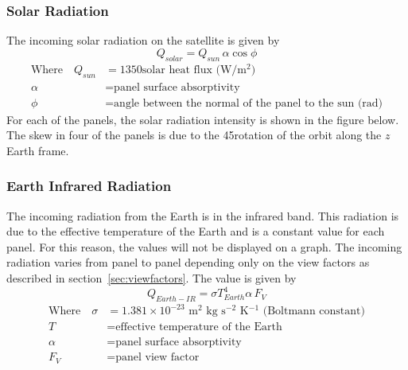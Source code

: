 \subsubsection{Solar Radiation}
The incoming solar radiation on the satellite is given by
\begin{equation}
    Q_{solar} = Q_{sun}\,\alpha\cos\phi
\end{equation}
\vspace{-1cm}
\begin{align}
\text{Where}\quad Q_{sun} &= 1350 \text{solar heat flux (W/m$^2$)} \nonumber\\
\alpha &= \text{panel surface absorptivity} \nonumber\\
\phi &= \text{angle between the normal of the panel to the sun (rad)} \nonumber
\end{align}
\noindent
For each of the panels, the solar radiation intensity is shown in the figure below. The skew in four of the panels is due to the 45\deg rotation of the orbit along the $z$ Earth frame.

\begin{figure}[H]
\end{figure}

\subsubsection{Earth Infrared Radiation}
The incoming radiation from the Earth is in the infrared band. This radiation is due to the effective temperature of the Earth and is a constant value for each panel. For this reason, the values will not be displayed on a graph. The incoming radiation varies from panel to panel depending only on the view factors as described in section~\ref{sec:viewfactors}. The value is given by
\begin{equation}
    Q_{Earth-IR} = \sigma T_{Earth}^4 \alpha \, F_V 
\end{equation}
\vspace{-1cm}
\begin{align}
\text{Where}\quad \sigma &= 1.381 \times 10^{-23}\text{ m$^2$ kg s$^{-2}$ K$^{-1}$ (Boltmann constant)} \nonumber\\
T &= \text{effective temperature of the Earth} \nonumber\\
\alpha &= \text{panel surface absorptivity} \nonumber\\
F_V &= \text{panel view factor} \nonumber
\end{align}

